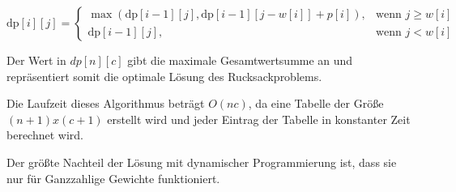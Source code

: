 \begin{equation}
    \text{dp}[i][j] = \begin{cases}
        \max(\text{dp}[i-1][j], \text{dp}[i-1][j-w[i]] + p[i]), & \text{wenn } j \geq w[i] \\
        \text{dp}[i-1][j], & \text{wenn } j < w[i]
    \end{cases}
\end{equation}


Der Wert in $dp[n][c]$ gibt die maximale Gesamtwertsumme an und 
repräsentiert somit die optimale Lösung des Rucksackproblems.

Die Laufzeit dieses Algorithmus beträgt $O(nc)$, da 
eine Tabelle der Größe $(n+1) x (c+1)$ erstellt wird und 
jeder Eintrag der Tabelle in konstanter Zeit berechnet wird.

Der größte Nachteil der Lösung mit dynamischer Programmierung ist, dass 
sie nur für Ganzzahlige Gewichte funktioniert.\ \cite[vgl.]{Martello1987}